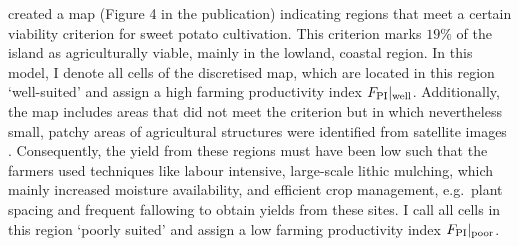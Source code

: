 \citet{Puleston2017} created a map (Figure 4 in the publication) 
indicating regions that meet a certain viability criterion for sweet potato cultivation.
This criterion marks $19\%$ of the island as agriculturally viable, mainly in the lowland, coastal region.
In this model, I denote all cells of the discretised map, which are located in this region `well-suited' and assign a high farming productivity index $F_{\rm PI}|_{\rm well}$.
Additionally, the map includes areas that did not meet the criterion but in which nevertheless small, patchy areas of agricultural structures were identified from satellite images \citet{Puleston2017}. 
Consequently, the yield from these regions must have been low such that the farmers used techniques like labour intensive, large-scale lithic mulching, which mainly increased moisture availability, and efficient crop management, e.g.\ plant spacing and frequent fallowing to obtain yields \citep{Louwagie2006} from these sites.
I call all cells in this region `poorly suited' and assign a low farming productivity index $F_{\rm PI}|_{\rm poor}$.

